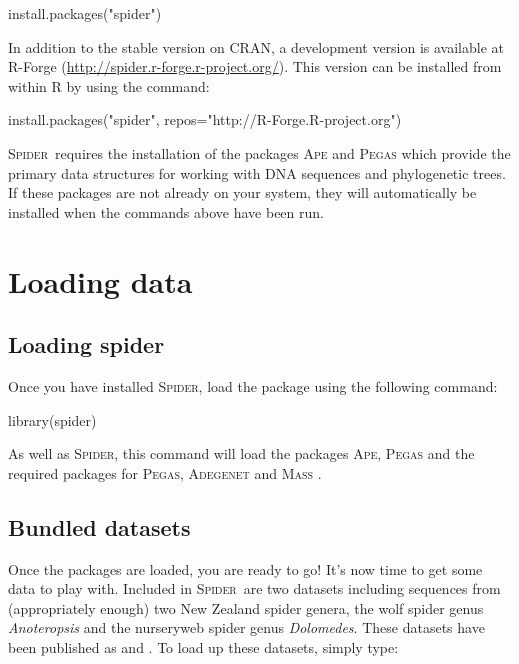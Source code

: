\documentclass{article}
\newcommand{\spider}{\textsc{Spider}~} %
\newcommand{\Spider}{\textsc{Spider}} %
\newcommand{\scinm}{\emph}
\newcommand{\progname}[1]{\textsc{#1}}
\begin{document}
\begin{console}
install.packages("spider")
\end{console}

In addition to the stable version on CRAN, a development version is available at R-Forge (\href{http://spider.r-forge.r-project.org/}{http://spider.r-forge.r-project.org/}). This version can be installed from within \progname{R} by using the command:

\begin{console}
install.packages("spider", repos="http://R-Forge.R-project.org")
\end{console}

\spider requires the installation of the packages \progname{Ape} \citep{SW.Para.2004.ape} and \progname{Pegas} \citep{SW.Para.2010.pegas} which provide the primary data structures for working with DNA sequences and phylogenetic trees. If these packages are not already on your system, they will automatically be installed when the commands above have been run.



\section{Loading data}

\subsection{Loading spider}
Once you have installed \Spider, load the package using the following command: 

\begin{console}
library(spider)
\end{console}

As well as \Spider, this command will load the packages \progname{Ape}, \progname{Pegas} and the required packages for \progname{Pegas}, \progname{Adegenet} \citep{Jomb.2008} and \progname{Mass} \citep{Vena.Ripl.2002}.


\subsection{Bundled datasets}
Once the packages are loaded, you are ready to go! It's now time to get some data to play with. Included in \spider are two datasets including sequences from (appropriately enough) two New Zealand spider genera, the wolf spider genus \scinm{Anoteropsis} and the nurseryweb spider genus \scinm{Dolomedes}. These datasets have been published as \citet{Vink.Pate.2003} and \citet{Vink.Dupe.2010}. To load up these datasets, simply type: 
\end{document}
